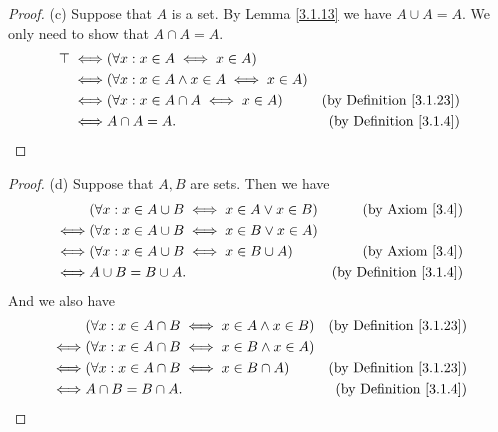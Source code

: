 \begin{proof}{(c)}
    Suppose that \(A\) is a set.
    By Lemma \ref{3.1.13} we have \(A \cup A = A\).
    We only need to show that \(A \cap A = A\).
    \begin{align*}
        \top \iff & (\forall x : x \in A \iff x \in A)                                                     \\
        \iff      & (\forall x : x \in A \land x \in A \iff x \in A)                                       \\
        \iff      & (\forall x : x \in A \cap A \iff x \in A)        & \text{(by Definition \ref{3.1.23})} \\
        \iff      & A \cap A = A.                                    & \text{(by Definition \ref{3.1.4})}
    \end{align*}
\end{proof}

\begin{proof}{(d)}
    Suppose that \(A, B\) are sets.
    Then we have
    \begin{align*}
             & (\forall x : x \in A \cup B \iff x \in A \lor x \in B) & \text{(by Axiom \ref{3.4})}        \\
        \iff & (\forall x : x \in A \cup B \iff x \in B \lor x \in A)                                      \\
        \iff & (\forall x : x \in A \cup B \iff x \in B \cup A)       & \text{(by Axiom \ref{3.4})}        \\
        \iff & A \cup B = B \cup A.                                   & \text{(by Definition \ref{3.1.4})}
    \end{align*}
    And we also have
    \begin{align*}
             & (\forall x : x \in A \cap B \iff x \in A \land x \in B) & \text{(by Definition \ref{3.1.23})} \\
        \iff & (\forall x : x \in A \cap B \iff x \in B \land x \in A)                                       \\
        \iff & (\forall x : x \in A \cap B \iff x \in B \cap A)        & \text{(by Definition \ref{3.1.23})} \\
        \iff & A \cap B = B \cap A.                                    & \text{(by Definition \ref{3.1.4})}
    \end{align*}
\end{proof}

